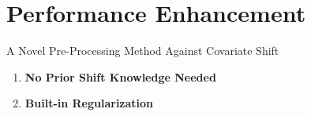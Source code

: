 \section{Performance Enhancement}


\begin{frame}{A Novel Pre-Processing Method Against Covariate Shift}
    \begin{enumerate}
        \item \textbf{No Prior Shift Knowledge Needed}
        
       
        \item \textbf{Built-in Regularization}
        
    \end{enumerate}
\end{frame}



